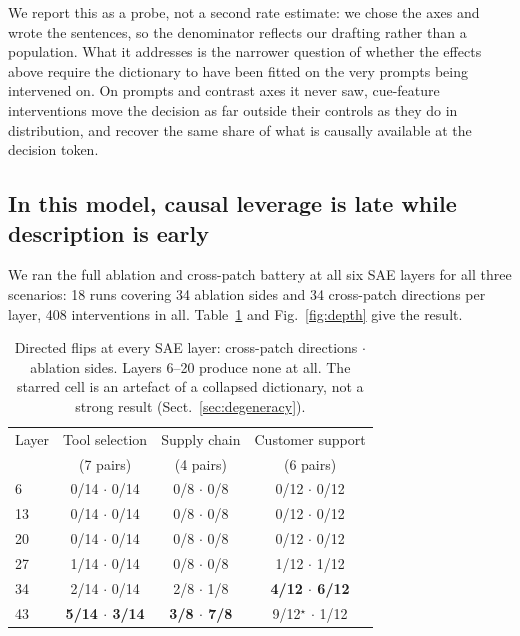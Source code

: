 \documentclass{article}
\begin{document}
We report this as a probe, not a second rate estimate: we chose the axes and wrote the sentences, so the denominator reflects our drafting rather than a population. What it addresses is the narrower question of whether the effects above require the dictionary to have been fitted on the very prompts being intervened on. On prompts and contrast axes it never saw, cue-feature interventions move the decision as far outside their controls as they do in distribution, and recover the same share of what is causally available at the decision token.

\subsection{In this model, causal leverage is late while description is early}
\label{sec:depth}

We ran the full ablation and cross-patch battery at all six SAE layers for all three scenarios: 18 runs covering 34 ablation sides and 34 cross-patch directions per layer, 408 interventions in all. Table~\ref{tab:depth} and Fig.~\ref{fig:depth} give the result.

\begin{table}[t]
\caption{Directed flips at every SAE layer: cross-patch directions $\cdot$ ablation sides. Layers 6--20 produce none at all. The starred cell is an artefact of a collapsed dictionary, not a strong result (Sect.~\ref{sec:degeneracy}).}
\label{tab:depth}
\centering
\small
\setlength{\tabcolsep}{9pt}
\begin{tabular}{@{}lccc@{}}
\toprule
Layer & Tool selection & Supply chain & Customer support \\
& (7 pairs) & (4 pairs) & (6 pairs) \\
\midrule
6  & 0/14 $\cdot$ 0/14 & 0/8 $\cdot$ 0/8 & 0/12 $\cdot$ 0/12 \\
13 & 0/14 $\cdot$ 0/14 & 0/8 $\cdot$ 0/8 & 0/12 $\cdot$ 0/12 \\
20 & 0/14 $\cdot$ 0/14 & 0/8 $\cdot$ 0/8 & 0/12 $\cdot$ 0/12 \\
27 & 1/14 $\cdot$ 0/14 & 0/8 $\cdot$ 0/8 & 1/12 $\cdot$ 1/12 \\
34 & 2/14 $\cdot$ 0/14 & 2/8 $\cdot$ 1/8 & \textbf{4/12 $\cdot$ 6/12} \\
43 & \textbf{5/14 $\cdot$ 3/14} & \textbf{3/8 $\cdot$ 7/8} & 9/12$^{\star}$ $\cdot$ 1/12 \\
\bottomrule
\end{tabular}
\end{table}
\end{document}
